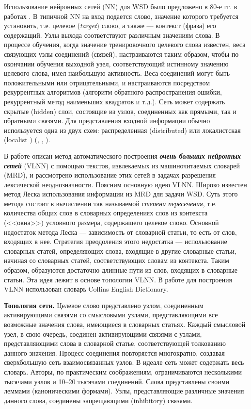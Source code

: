 \documentclass{article}
\begin{document}
\begin{articletext}
Использование нейронных сетей (NN)  для WSD было предложено в 80-е гг. в работах \cite{COTTRELL 1983,WALTZ 1985}. В типичной NN на вход   подается   слово, значение которого требуется установить, т.е. целевое (\textit{target}) слово, а также --- контекст (фраза) его содержащий. Узлы выхода соответствуют различным значениям слова. В процессе обучения, когда значение тренировочного целевого слова известен, веса связующих узлы соединений (связей), настраиваются таким образом, чтобы по окончании обучения выходной узел, соответствующий истинному значению целевого слова, имел наибольшую активность. Веса соединений могут быть  положительными или отрицательными, и настраиваются посредством рекуррентных алгоритмов (алгоритм обратного распространения ошибки,  рекуррентный метод наименьших квадратов и т.д.). Сеть может содержать скрытые (hidden) слои, состоящие из узлов, соединенных как прямыми, так и обратными связями. Для представления входной информации обычно используется одна из двух схем:  распределенная (distributed) или локалистская (localist ) (\cite{Hinton 1986}, \cite{COTTRELL 1989}, \cite{Azzini}). 

В работе \cite{VERONIS 1990} описан метод автоматического построения \textbf{\textit{очень больших нейронных сетей}} (VLNN) с помощью текстов, извлекаемых из машиночитаемых словарей (MRD), и рассмотрено использование этих сетей в задачах разрешения лексической неоднозначности. Поясним основную идею VLNN.  Широко известен метод Леска \cite{LESK 1986}  использования  информации  из MRD для  задачи  WSD.  Суть этого метода состоит в вычислении  так называемой \textit{степени пересечения}, т.е.  количества общих слов в словарных определениях слов из контекста (<<окна>>) условного размера, содержащего целевое слово. Основной недостаток метода Леска --- зависимость  от  словарной  статьи, то есть от слов, входящих в нее. Стратегия преодоления  этого  недостатка --- использование словарных статей, определяющих слова, входящие в другие словарные статьи, начиная со словарных статей, соответствующих  словам  из  контекста. Таким образом, образуются  достаточно  длинные   пути  из слов, входящих в словарные статьи. Эта  идея  лежит  в  основе  топологии VLNN. В работе \cite{VERONIS 1990}  для построения  VLNN использован  словарь  Collins  English  Dictionary.

\textbf{Топология сети.} Целевое слово представлено  узлом, соединенным активирующими  связями со смысловыми узлами, представляющими все возможные значения слова, имеющиеся  в словарных статьях. Каждый смысловой узел, в свою очередь, соединен  активирующими  связями с узлами, представляющими  слова в словарной статье, соответствующей толкованию данного значения. Процесс соединения повторяется многократно, создавая сверхбольшую сеть взаимосвязанных узлов. В идеале сеть может содержать весь словарь. Авторы, по практическим соображениям, ограничиваются несколькими тысячами узлов и 10–20 тысячами соединений. Слова представлены своими леммами (каноническими формами). Узлы, представляющие различные значения данного слова, соединены запрещающими (inhibitory) связями.  


\end{articletext}
\end{document}
